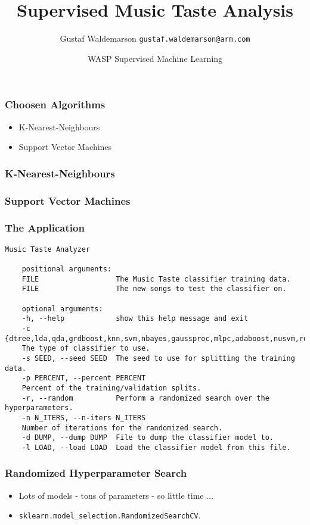 \documentclass{beamer}
\title{Supervised Music Taste Analysis}
\date{WASP Supervised Machine Learning}
\author[Gustaf]{Gustaf Waldemarson \texttt{gustaf.waldemarson@arm.com}}
\begin{document}
\begin{frame}
  \titlepage
\end{frame}


\begin{frame}
  \frametitle{Choosen Algorithms}
  \begin{itemize}
  \item K-Nearest-Neighbours
  \item Support Vector Machines
  \end{itemize}
\end{frame}


\begin{frame}
  \frametitle{K-Nearest-Neighbours}

\end{frame}

\begin{frame}
  \frametitle{Support Vector Machines}

\end{frame}


\begin{frame}[fragile]
  \frametitle{The Application}

\begin{Verbatim}[fontsize=\footnotesize]
    Music Taste Analyzer

    positional arguments:
    FILE                  The Music Taste classifier training data.
    FILE                  The new songs to test the classifier on.

    optional arguments:
    -h, --help            show this help message and exit
    -c {dtree,lda,qda,grdboost,knn,svm,nbayes,gaussproc,mlpc,adaboost,nusvm,rdforest},
    The type of classifier to use.
    -s SEED, --seed SEED  The seed to use for splitting the training data.
    -p PERCENT, --percent PERCENT
    Percent of the training/validation splits.
    -r, --random          Perform a randomized search over the hyperparameters.
    -n N_ITERS, --n-iters N_ITERS
    Number of iterations for the randomized search.
    -d DUMP, --dump DUMP  File to dump the classifier model to.
    -l LOAD, --load LOAD  Load the classifier model from this file.
\end{Verbatim}

\end{frame}


\begin{frame}
  \frametitle{Randomized Hyperparameter Search}

  \begin{itemize}
  \item Lots of models - tons of parameters - so little time $\ldots$
  \item \texttt{sklearn.model\_selection.RandomizedSearchCV}.
  \end{itemize}



\end{frame}
\end{document}
